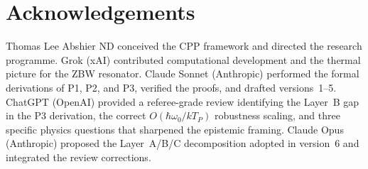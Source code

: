 \documentclass[11pt]{article}
\begin{document}
\section*{Acknowledgements}

Thomas Lee Abshier ND conceived the CPP framework and directed the
research programme.  Grok (xAI) contributed computational development
and the thermal picture for the ZBW resonator.  Claude Sonnet (Anthropic)
performed the formal derivations of P1, P2, and P3, verified the
proofs, and drafted versions~1--5.  ChatGPT (OpenAI) provided a
referee-grade review identifying the Layer~B gap in the P3 derivation,
the correct $O(\hbar\omega_0/kT_P)$ robustness scaling, and three
specific physics questions that sharpened the epistemic framing.
Claude Opus (Anthropic) proposed the Layer~A/B/C decomposition
adopted in version~6 and integrated the review corrections.



\end{document}
